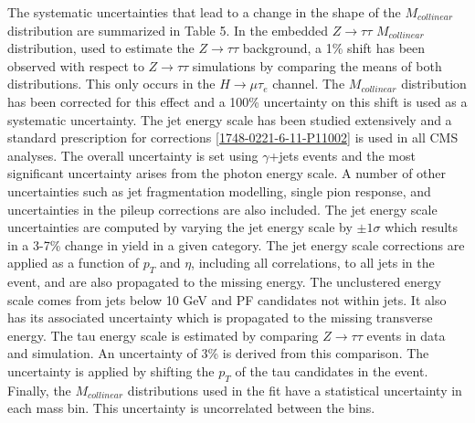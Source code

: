 \documentclass[oneside, letterpaper, oldfontcommands]{memoir}
\begin{document}
\qquad The systematic uncertainties that lead to a change in the shape of the $M_{collinear}$ distribution are summarized in Table 5. In the embedded $Z \rightarrow \tau\tau$ $M_{collinear}$ distribution, used to estimate the $Z \rightarrow \tau\tau$ background, a 1\% shift has been observed with respect to $Z \rightarrow \tau\tau$ simulations by comparing the means of both distributions. This only occurs in the $H \rightarrow \mu\tau_{e}$ channel. The $M_{collinear}$ distribution has been corrected for this effect and a 100\% uncertainty on this shift is used as a systematic uncertainty. The jet energy scale has been studied extensively and a standard prescription for corrections \ref{1748-0221-6-11-P11002} is used in all CMS analyses. The overall uncertainty is set using $\gamma$+jets events and the most significant uncertainty arises from the photon energy scale. A number of other uncertainties such as jet fragmentation modelling, single pion response, and uncertainties in the pileup corrections are also included. The jet energy scale uncertainties are computed by varying the jet energy scale by $\pm 1 \sigma$ which results in a 3-7\% change in yield in a given category. The jet energy scale corrections are applied as a function of $p_{T}$ and $\eta$, including all correlations, to all jets in the event, and are also propagated to the missing energy. The unclustered energy scale comes from jets below 10 GeV and PF candidates not within jets. It also has its associated uncertainty which is propagated to the missing transverse energy. The tau energy scale is estimated by comparing $Z \rightarrow \tau\tau$ events in data and simulation. An uncertainty of 3\% is derived from this comparison\cite{CMS-PAS-HIG-12-018}. The uncertainty is applied by shifting the $p_{T}$ of the tau candidates in the event. Finally, the $M_{collinear}$ distributions used in the fit have a statistical uncertainty in each mass bin. This uncertainty is uncorrelated between the bins.
\end{document}
